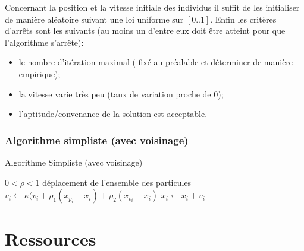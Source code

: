 \documentclass[12pt]{article}
\begin{document}
    Concernant la position et la vitesse initiale des individus il suffit de les initialiser de manière aléatoire suivant une loi uniforme sur $[0..1]$.
    Enfin les critères d'arrêts sont les suivants (au moins un d'entre eux doit être atteint pour que l'algorithme s'arrête):

\begin{itemize}
	\item le nombre d'itération maximal ( fixé au-préalable et déterminer de manière empirique);
    \item la vitesse varie très peu (taux de variation proche de 0);
    \item l'aptitude/convenance de la solution est acceptable.
\end{itemize}
    
    
    \subsubsection{ Algorithme simpliste (avec voisinage) }
    
    \begin{algorithm}
    \caption{Algorithme Simpliste (avec voisinage)}
    \begin{algorithmic}
      \REQUIRE $ 0 < \rho < 1 $        %
      \ENSURE déplacement de l'ensemble des particules
      \REPEAT
              \ENDIF
              \ENDIF
           \ENDFOR
              \STATE $ v_{i} \leftarrow \kappa (v_{i} + \rho_{1} (x_{p_{i}} - x_{i}) + \rho_{2} (x_{v_{i}} - x_{i}) $
              \STATE $ x_{i} \leftarrow x_{i} + v_{i} $
          \ENDFOR
    \end{algorithmic}
    \end{algorithm}
    
\section{Ressources}
\end{document}
